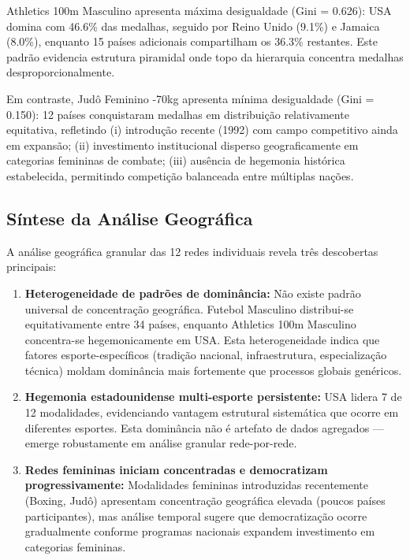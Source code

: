 Athletics 100m Masculino apresenta máxima desigualdade (Gini = 0.626): USA domina com 46.6\% das medalhas, seguido por Reino Unido (9.1\%) e Jamaica (8.0\%), enquanto 15 países adicionais compartilham os 36.3\% restantes. Este padrão evidencia estrutura piramidal onde topo da hierarquia concentra medalhas desproporcionalmente.

Em contraste, Judô Feminino -70kg apresenta mínima desigualdade (Gini = 0.150): 12 países conquistaram medalhas em distribuição relativamente equitativa, refletindo (i) introdução recente (1992) com campo competitivo ainda em expansão; (ii) investimento institucional disperso geograficamente em categorias femininas de combate; (iii) ausência de hegemonia histórica estabelecida, permitindo competição balanceada entre múltiplas nações.

\subsection{Síntese da Análise Geográfica}

A análise geográfica granular das 12 redes individuais revela três descobertas principais:

\begin{enumerate}
    \item \textbf{Heterogeneidade de padrões de dominância:} Não existe padrão universal de concentração geográfica. Futebol Masculino distribui-se equitativamente entre 34 países, enquanto Athletics 100m Masculino concentra-se hegemonicamente em USA. Esta heterogeneidade indica que fatores esporte-específicos (tradição nacional, infraestrutura, especialização técnica) moldam dominância mais fortemente que processos globais genéricos.

    \item \textbf{Hegemonia estadounidense multi-esporte persistente:} USA lidera 7 de 12 modalidades, evidenciando vantagem estrutural sistemática que ocorre em diferentes esportes. Esta dominância não é artefato de dados agregados — emerge robustamente em análise granular rede-por-rede.

    \item \textbf{Redes femininas iniciam concentradas e democratizam progressivamente:} Modalidades femininas introduzidas recentemente (Boxing, Judô) apresentam concentração geográfica elevada (poucos países participantes), mas análise temporal sugere que democratização ocorre gradualmente conforme programas nacionais expandem investimento em categorias femininas.
\end{enumerate}

